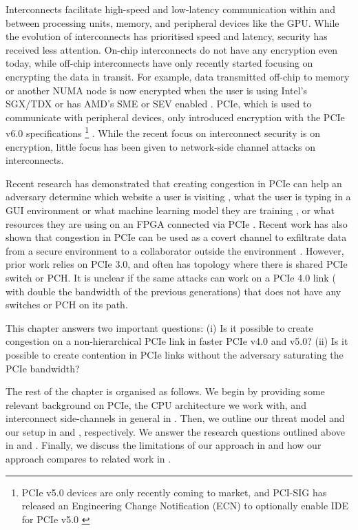 
Interconnects facilitate high-speed and low-latency communication within and between processing units, memory, and peripheral devices like the GPU.
While the evolution of interconnects has prioritised speed and latency, security has received less attention.
On-chip interconnects do not have any encryption even today, while off-chip interconnects have only recently started focusing on encrypting the data in transit.
For example, data transmitted off-chip to memory or another NUMA node is now encrypted when the user is using Intel's SGX/TDX or has AMD's SME or SEV enabled \cite{intel_upi_encryption, amd_gen_5_arch}.
PCIe, which is used to communicate with peripheral devices, only introduced encryption with the PCIe v6.0 specifications 
\footnote{PCIe v5.0 devices are only recently coming to market, and PCI-SIG has released an Engineering Change Notification (ECN) to optionally enable IDE for PCIe v5.0 \cite{pcie_ide_v5_ecn}}
\cite{pcie_ide_v6}.
While the recent focus on interconnect security is on encryption, little focus has been given to network-side channel attacks on interconnects.

Recent research has demonstrated that creating congestion in PCIe can help an adversary determine which website a user is visiting \cite{tan2021invisible, side2022lockeddown}, what the user is typing in a GUI environment or what machine learning model they are training \cite{tan2021invisible}, or what resources they are using on an FPGA connected via PCIe \cite{giechaskiel2022cross}.
Recent work has also shown that congestion in PCIe can be used as a covert channel to exfiltrate data from a secure environment to a collaborator outside the environment \cite{giechaskiel2022cross, khaliq2021timing}.
However, prior work relies on PCIe 3.0, and often has topology where there is shared PCIe switch or PCH.
It is unclear if the same attacks can work on a PCIe 4.0 link ( with double the bandwidth of the previous generations) that does not have any switches or PCH on its path.

This chapter answers two important questions:
(i) Is it possible to create congestion on a non-hierarchical PCIe link in faster PCIe v4.0 and v5.0?
(ii) Is it possible to create contention in PCIe links without the adversary saturating the PCIe bandwidth?

The rest of the chapter is organised as follows.
We begin by providing some relevant background on PCIe, the CPU architecture we work with, and interconnect side-channels in general in . 
Then, we outline our threat model and our setup in  and , respectively.
We answer the research questions outlined above in  and .
Finally, we discuss the limitations of our approach in  and how our approach compares to related work in .
